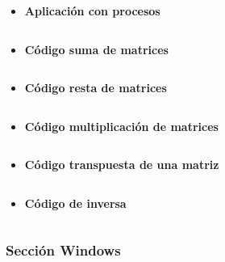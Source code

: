 \documentclass[12pt]{article}
\begin{document}
\begin{itemize}
                    \begin{itemize}
                        \item \textbf{Aplicación con procesos}
                            \inputminted{octave}{Code/Linux/8.c}
                        \item \textbf{Código suma de matrices}
                            \inputminted{octave}{Code/Linux/suma.c}

                        \item \textbf{Código resta de matrices}
                            \inputminted{octave}{Code/Linux/suma.c}

                        \item \textbf{Código multiplicación de matrices}
                            \inputminted{octave}{Code/Linux/suma.c}  

                        \item \textbf{Código transpuesta de una matriz}
                            \inputminted{octave}{Code/Linux/suma.c}

                        \item \textbf{Código de inversa}
                            \inputminted{octave}{Code/Linux/suma.c}

                    \end{itemize}
        	\end{itemize}
    	
    	\subsubsection{Sección Windows}
    	
\end{document}
